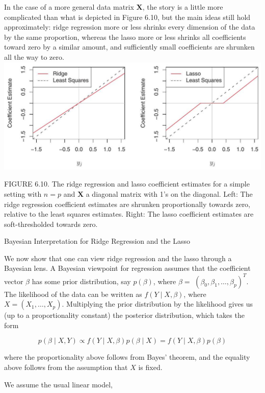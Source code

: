 \documentclass[10pt]{article}
\begin{document}
In the case of a more general data matrix $\mathbf{X}$, the story is a little more complicated than what is depicted in Figure 6.10, but the main ideas still hold approximately: ridge regression more or less shrinks every dimension of the data by the same proportion, whereas the lasso more or less shrinks all coefficients toward zero by a similar amount, and sufficiently small coefficients are shrunken all the way to zero.\\
\includegraphics[max width=\textwidth, center]{2025_05_05_efe77898333945044de4g-241}

FIGURE 6.10. The ridge regression and lasso coefficient estimates for a simple setting with $n=p$ and $\mathbf{X}$ a diagonal matrix with 1's on the diagonal. Left: The ridge regression coefficient estimates are shrunken proportionally towards zero, relative to the least squares estimates. Right: The lasso coefficient estimates are soft-thresholded towards zero.

Bayesian Interpretation for Ridge Regression and the Lasso

We now show that one can view ridge regression and the lasso through a Bayesian lens. A Bayesian viewpoint for regression assumes that the coefficient vector $\beta$ has some prior distribution, say $p(\beta)$, where $\beta=$ $\left(\beta_{0}, \beta_{1}, \ldots, \beta_{p}\right)^{T}$. The likelihood of the data can be written as $f(Y \mid X, \beta)$, where $X=\left(X_{1}, \ldots, X_{p}\right)$. Multiplying the prior distribution by the likelihood gives us (up to a proportionality constant) the posterior distribution, which takes the form

$$
p(\beta \mid X, Y) \propto f(Y \mid X, \beta) p(\beta \mid X)=f(Y \mid X, \beta) p(\beta)
$$

where the proportionality above follows from Bayes' theorem, and the equality above follows from the assumption that $X$ is fixed.

We assume the usual linear model,
\end{document}
